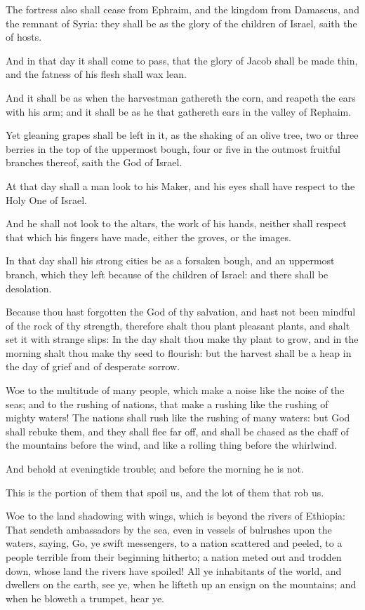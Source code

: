 \Verse The fortress also shall cease from Ephraim, and the kingdom from Damascus, and the remnant of Syria: they shall be as the glory of the children of Israel, saith the \LORD of hosts.

\Verse And in that day it shall come to pass, that the glory of Jacob shall be made thin, and the fatness of his flesh shall wax lean.

\Verse And it shall be as when the harvestman gathereth the corn, and reapeth the ears with his arm; and it shall be as he that gathereth ears in the valley of Rephaim.

\Verse Yet gleaning grapes shall be left in it, as the shaking of an olive tree, two or three berries in the top of the uppermost bough, four or five in the outmost fruitful branches thereof, saith the \LORD God of Israel.

\Verse At that day shall a man look to his Maker, and his eyes shall have respect to the Holy One of Israel.

\Verse And he shall not look to the altars, the work of his hands, neither shall respect that which his fingers have made, either the groves, or the images.

\Verse In that day shall his strong cities be as a forsaken bough, and an uppermost branch, which they left because of the children of Israel: and there shall be desolation.

\Verse Because thou hast forgotten the God of thy salvation, and hast not been mindful of the rock of thy strength, therefore shalt thou plant pleasant plants, and shalt set it with strange slips: \Verse In the day shalt thou make thy plant to grow, and in the morning shalt thou make thy seed to flourish: but the harvest shall be a heap in the day of grief and of desperate sorrow.

\Verse Woe to the multitude of many people, which make a noise like the noise of the seas; and to the rushing of nations, that make a rushing like the rushing of mighty waters!  \Verse The nations shall rush like the rushing of many waters: but God shall rebuke them, and they shall flee far off, and shall be chased as the chaff of the mountains before the wind, and like a rolling thing before the whirlwind.

\Verse And behold at eveningtide trouble; and before the morning he is not.

This is the portion of them that spoil us, and the lot of them that rob us.


\Chapter
\Verse Woe to the land shadowing with wings, which is beyond the rivers of Ethiopia: \Verse That sendeth ambassadors by the sea, even in vessels of bulrushes upon the waters, saying, Go, ye swift messengers, to a nation scattered and peeled, to a people terrible from their beginning hitherto; a nation meted out and trodden down, whose land the rivers have spoiled!  \Verse All ye inhabitants of the world, and dwellers on the earth, see ye, when he lifteth up an ensign on the mountains; and when he bloweth a trumpet, hear ye.

